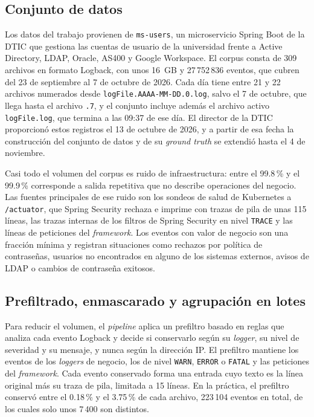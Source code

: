 \subsection{Conjunto de datos}\label{sec:met_dataset}

Los datos del trabajo provienen de \texttt{ms-users}, un microservicio Spring Boot de la DTIC que gestiona las cuentas de usuario de la universidad frente a Active Directory, LDAP, Oracle, AS400 y Google Workspace. El corpus consta de 309 archivos en formato Logback, con unos 16~GB y 27\,752\,836 eventos, que cubren del 23 de septiembre al 7 de octubre de 2026. Cada día tiene entre 21 y 22 archivos numerados desde \texttt{logFile.AAAA-MM-DD.0.log}, salvo el 7 de octubre, que llega hasta el archivo \texttt{.7}, y el conjunto incluye además el archivo activo \texttt{logFile.log}, que termina a las 09:37 de ese día. El director de la DTIC proporcionó estos registros el 13 de octubre de 2026, y a partir de esa fecha la construcción del conjunto de datos y de su \textit{ground truth} se extendió hasta el 4 de noviembre.

Casi todo el volumen del corpus es ruido de infraestructura: entre el 99.8\,\% y el 99.9\,\% corresponde a salida repetitiva que no describe operaciones del negocio. Las fuentes principales de ese ruido son los sondeos de salud de Kubernetes a \texttt{/actuator}, que Spring Security rechaza e imprime con trazas de pila de unas 115 líneas, las trazas internas de los filtros de Spring Security en nivel \texttt{TRACE} y las líneas de peticiones del \textit{framework}. Los eventos con valor de negocio son una fracción mínima y registran situaciones como rechazos por política de contraseñas, usuarios no encontrados en alguno de los sistemas externos, avisos de LDAP o cambios de contraseña exitosos.

\subsection{Prefiltrado, enmascarado y agrupación en lotes}\label{subsec:met_prefiltro}\label{subsec:met_batches}

Para reducir el volumen, el \textit{pipeline} aplica un prefiltro basado en reglas que analiza cada evento Logback y decide si conservarlo según su \textit{logger}, su nivel de severidad y su mensaje, y nunca según la dirección IP. El prefiltro mantiene los eventos de los \textit{loggers} de negocio, los de nivel \texttt{WARN}, \texttt{ERROR} o \texttt{FATAL} y las peticiones del \textit{framework}. Cada evento conservado forma una entrada cuyo texto es la línea original más su traza de pila, limitada a 15 líneas. En la práctica, el prefiltro conservó entre el 0.18\,\% y el 3.75\,\% de cada archivo, 223\,104 eventos en total, de los cuales solo unos 7\,400 son distintos.

